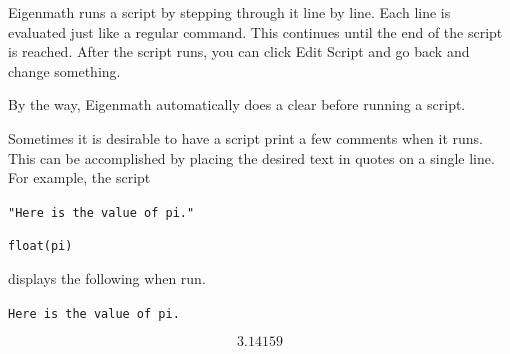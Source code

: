 \medskip
\noindent
Eigenmath runs a script by stepping through it line by line.
Each line is evaluated just like a regular command.
This continues until the end of the script is reached.
After the script runs, you can click Edit Script and go back and change something.

\medskip
\noindent
By the way, Eigenmath automatically does a clear before
running a script.

\newpage

\noindent
Sometimes it is desirable to have a script print a few comments when it runs.
This can be accomplished by placing the desired text in quotes
on a single line.
For example, the script

\medskip
\verb$"Here is the value of pi."$

\verb$float(pi)$

\medskip
\noindent
displays the following when run.

\medskip
\verb$Here is the value of pi.$

$$3.14159$$

